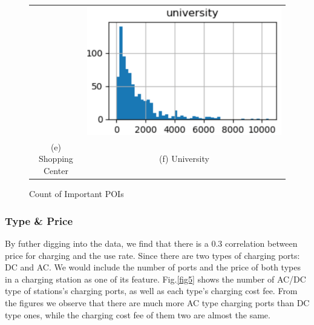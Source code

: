 \begin{figure}[!htbp]
\begin{tabular}{cc}
		&
		\includegraphics[width=0.45\columnwidth]{./figures/university.pdf} \\
		(e) Shopping Center & (f) University
	\end{tabular}
	\centering
	\caption{Count of Important POIs}
	\label{fig4}
\end{figure}

\subsubsection{Type \& Price}
By futher digging into the data, we find that there is a 0.3 correlation between price for charging and the use rate. Since there are two types of charging ports: DC and AC. We would include the number of ports and the price of both types in a charging station as one of its feature. Fig.\ref{fig5} shows the number of AC/DC type of stations's charging ports, as well as each type's charging cost fee. From the figures we observe that there are much more AC type charging ports than DC type ones, while the charging cost fee of them two are almost the same.

